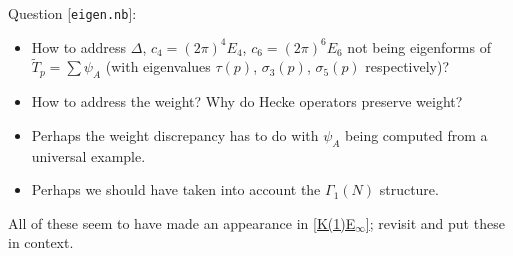 \documentclass{rs}
\theoremstyle{definition}
\theoremstyle{remark}
\newcommand{\G}{\Gamma}
\numberwithin{equation}{section}
\numberwithin{thm}{section}
\begin{document}
Question [\texttt{eigen.nb}]: 
\begin{itemize}
 \item[] How to address $\Delta$, $c_4 = (2 \pi)^4 E_4$, $c_6 = (2 \pi)^6 E_6$ not being eigenforms of $\tilde{T}_p = \sum \psi_A$ 
 (with eigenvalues $\tau(p)$, $\sigma_3(p)$, $\sigma_5(p)$ respectively)?  

 \item[] How to address the weight?  Why do Hecke operators preserve weight?  

 \item[] Perhaps the weight discrepancy has to do with $\psi_A$ being computed from a universal example.  

 \item[] Perhaps we should have taken into account the $\G_1(N)$ structure.  
\end{itemize}

All of these seem to have made an appearance in \href{http://tinyurl.com/qdtdpaw}{[K(1)E$_\infty$]}; revisit and put these in context.  
\end{document}
